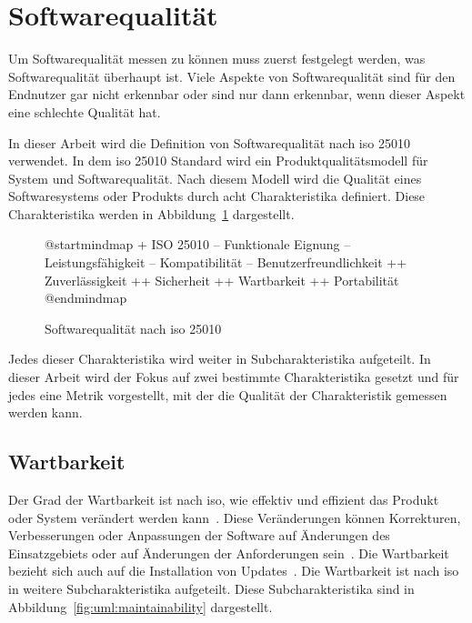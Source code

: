 \documentclass[12pt, a4paper, ngerman]{article}
\begin{document}
\section{Softwarequalität}

Um Softwarequalität messen zu können muss zuerst festgelegt werden,
was Softwarequalität überhaupt ist.
Viele Aspekte von Softwarequalität sind für den Endnutzer gar nicht
erkennbar oder sind nur dann erkennbar, 
wenn dieser Aspekt eine schlechte Qualität hat.

In dieser Arbeit wird die Definition von Softwarequalität 
nach \ac{iso} 25010\cite{ISO25010} verwendet.
In dem \ac{iso} 25010 Standard wird ein Produktqualitätsmodell
für System und Softwarequalität.
Nach diesem Modell wird die Qualität eines Softwaresystems oder Produkts
durch acht Charakteristika definiert.
Diese Charakteristika werden in Abbildung~\ref*{fig:uml:softwarequality} dargestellt.

\begin{figure}
  \centering
  \begin{plantuml}
      @startmindmap
      + ISO 25010 
      -- Funktionale Eignung
      -- Leistungsfähigkeit
      -- Kompatibilität
      -- Benutzerfreundlichkeit
      ++ Zuverlässigkeit
      ++ Sicherheit
      ++ Wartbarkeit
      ++ Portabilität
      @endmindmap
  \end{plantuml}
  \caption{Softwarequalität nach \ac{iso} 25010\cite{ISO25010}}
  \label{fig:uml:softwarequality}
\end{figure}

Jedes dieser Charakteristika wird weiter in Subcharakteristika aufgeteilt.
In dieser Arbeit wird der Fokus auf zwei bestimmte Charakteristika gesetzt
und für jedes eine Metrik vorgestellt, 
mit der die Qualität der Charakteristik gemessen werden kann.


\subsection{Wartbarkeit}

Der Grad der Wartbarkeit ist nach \ac{iso},
wie effektiv und effizient das Produkt oder System verändert werden kann~\cite{ISO25010}.
Diese Veränderungen können Korrekturen, Verbesserungen
oder Anpassungen der Software auf Änderungen des Einsatzgebiets
oder auf Änderungen der Anforderungen sein~\cite{ISO25010}.
Die Wartbarkeit bezieht sich auch auf die Installation von Updates~\cite{ISO25010}.
Die Wartbarkeit ist nach \ac{iso} in weitere Subcharakteristika aufgeteilt.
Diese Subcharakteristika sind in Abbildung~\ref{fig:uml:maintainability} dargestellt.
\end{document}
